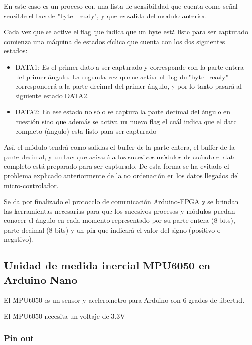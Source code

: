 En este caso es un proceso con una lista de sensibilidad que cuenta como señal sensible el bus de "byte\_ready", y que es salida del modulo anterior. \newline

Cada vez que se active el flag que indica que un byte está listo para ser capturado comienza una máquina de estados cíclica que cuenta con los dos siguientes estados:

\begin{itemize}
	 \item DATA1: Es el primer dato a ser capturado y corresponde con la parte entera del primer ángulo. La segunda vez que se active el flag de "byte\_ready" corresponderá a la parte decimal del primer ángulo, y por lo tanto pasará al siguiente estado DATA2.
	 \item DATA2: En ese estado no sólo se captura la parte decimal del ángulo en cuestión sino que además se activa un nuevo flag el cuál indica que el dato completo (ángulo) esta listo para ser capturado. 
\end{itemize}

Así, el módulo tendrá como salidas el buffer de la parte entera, el buffer de la parte decimal, y un bus que avisará a los sucesivos módulos de cuándo el dato completo está preparado para ser capturado. De esta forma se ha evitado el problema explicado anteriormente de la no ordenación en los datos llegados del micro-controlador.  \newline

Se da por finalizado el protocolo de comunicación Arduino-FPGA y se brindan las herramientas necesarias para que los sucesivos procesos y módulos puedan conocer el ángulo en cada momento representado por su parte entera (8 bits), parte decimal (8 bits) y un pin que indicará el valor del signo (positivo o negativo).

\subsection{Unidad de medida inercial MPU6050 en Arduino Nano}\label{sec:MPU6050}

El MPU6050 es un sensor y acelerometro para Arduino con 6 grados de libertad. 

El MPU6050 necesita un voltaje de 3.3V. 

\subsubsection{Pin out}

